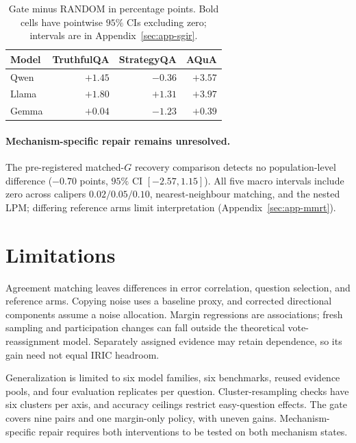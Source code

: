 \documentclass[11pt,a4paper]{article}
\theoremstyle{definition}
\begin{document}
\begin{table}[t]
\centering\footnotesize
\setlength{\tabcolsep}{4pt}
\renewcommand{\arraystretch}{1.02}
\caption{Gate minus RANDOM in percentage points. Bold cells have pointwise $95\%$ CIs excluding zero; intervals are in Appendix~\ref{sec:app-sgir}.}
\label{tab:sgir-heterogeneity}
\begin{tabularx}{\columnwidth}{@{}Zrrr@{}}
\toprule
Model & TruthfulQA & StrategyQA & AQuA\\
\midrule
Qwen & $+1.45$ & $-0.36$ & $\mathbf{+3.57}$\\
Llama & $+1.80$ & $+1.31$ & $\mathbf{+3.97}$\\
Gemma & $+0.04$ & $-1.23$ & $+0.39$\\
\bottomrule
\end{tabularx}
\end{table}

\paragraph{Mechanism-specific repair remains unresolved.}
The pre-registered matched-$G$ recovery comparison detects no population-level difference ($-0.70$ points, $95\%$ CI $[-2.57,1.15]$). All five macro intervals include zero across calipers $0.02/0.05/0.10$, nearest-neighbour matching, and the nested LPM; differing reference arms limit interpretation (Appendix~\ref{sec:app-mmrt}).

\section{Limitations}

\label{sec:limitations}

Agreement matching leaves differences in error correlation, question selection, and reference arms. Copying noise uses a baseline proxy, and corrected directional components assume a noise allocation. Margin regressions are associations; fresh sampling and participation changes can fall outside the theoretical vote-reassignment model. Separately assigned evidence may retain dependence, so its gain need not equal IRIC headroom.

Generalization is limited to six model families, six benchmarks, reused evidence pools, and four evaluation replicates per question. Cluster-resampling checks have six clusters per axis, and accuracy ceilings restrict easy-question effects. The gate covers nine pairs and one margin-only policy, with uneven gains. Mechanism-specific repair requires both interventions to be tested on both mechanism states.
\end{document}
